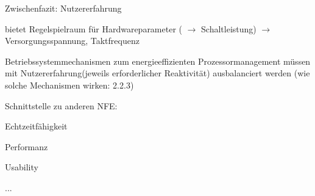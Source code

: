 \documentclass[a4paper]{article}
\begin{document}
\begin{multicols}{3}
    Zwischenfazit: Nutzererfahrung

    \begin{itemize*}
        \item
        bietet Regelspielraum für Hardwareparameter (
        $\rightarrow$ Schaltleistung)
        $\rightarrow$ Versorgungsspannung, Taktfrequenz
        \item
        Betriebssystemmechanismen zum energieeffizienten Prozessormanagement
        müssen mit Nutzererfahrung(jeweils erforderlicher Reaktivität)
        ausbalanciert werden (wie solche Mechanismen wirken: 2.2.3)
        \item
        Schnittstelle zu anderen NFE:
        \begin{itemize*}
            \item Echtzeitfähigkeit
            \item Performanz
            \item Usability
            \item ...
        \end{itemize*}
    \end{itemize*}



\end{multicols}
\end{document}
